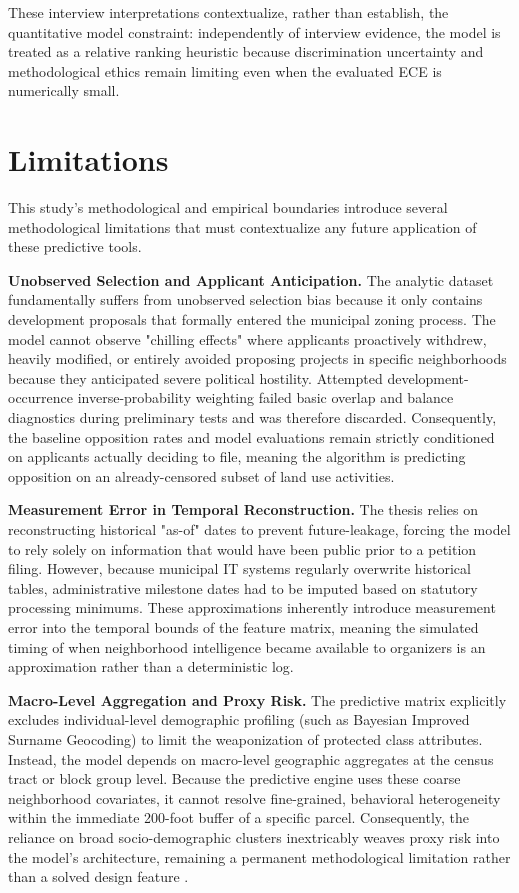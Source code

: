 \documentclass[11pt, letterpaper, oneside]{article}
\begin{document}
These interview interpretations contextualize, rather than establish, the quantitative model constraint: independently of interview evidence, the model is treated as a relative ranking heuristic because discrimination uncertainty and methodological ethics remain limiting even when the evaluated ECE is numerically small.

\section{Limitations}
\label{sec:limitations}

This study's methodological and empirical boundaries introduce several methodological limitations that must contextualize any future application of these predictive tools. 

\textbf{Unobserved Selection and Applicant Anticipation.} The analytic dataset fundamentally suffers from unobserved selection bias because it only contains development proposals that formally entered the municipal zoning process. The model cannot observe "chilling effects" where applicants proactively withdrew, heavily modified, or entirely avoided proposing projects in specific neighborhoods because they anticipated severe political hostility. Attempted development-occurrence inverse-probability weighting failed basic overlap and balance diagnostics during preliminary tests and was therefore discarded. Consequently, the baseline opposition rates and model evaluations remain strictly conditioned on applicants actually deciding to file, meaning the algorithm is predicting opposition on an already-censored subset of land use activities.

\textbf{Measurement Error in Temporal Reconstruction.} The thesis relies on reconstructing historical "as-of" dates to prevent future-leakage, forcing the model to rely solely on information that would have been public prior to a petition filing. However, because municipal IT systems regularly overwrite historical tables, administrative milestone dates had to be imputed based on statutory processing minimums. These approximations inherently introduce measurement error into the temporal bounds of the feature matrix, meaning the simulated timing of when neighborhood intelligence became available to organizers is an approximation rather than a deterministic log.

\textbf{Macro-Level Aggregation and Proxy Risk.} The predictive matrix explicitly excludes individual-level demographic profiling (such as Bayesian Improved Surname Geocoding) to limit the weaponization of protected class attributes. Instead, the model depends on macro-level geographic aggregates at the census tract or block group level. Because the predictive engine uses these coarse neighborhood covariates, it cannot resolve fine-grained, behavioral heterogeneity within the immediate 200-foot buffer of a specific parcel. Consequently, the reliance on broad socio-demographic clusters inextricably weaves proxy risk into the model's architecture, remaining a permanent methodological limitation rather than a solved design feature \cite{barocas2016,benjamin2019race,obermeyer2019racial}. 
\end{document}
